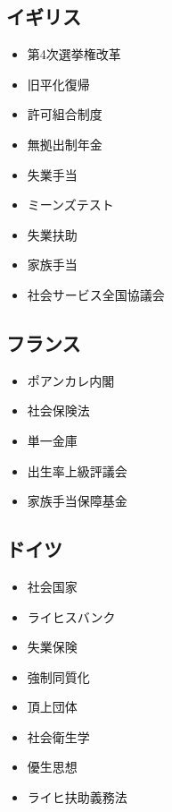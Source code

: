 \documentclass{jsarticle}
\begin{document}
\subsection{イギリス}
\begin{itemize}
	\item 第4次選挙権改革
	\item 旧平化復帰
	\item 許可組合制度
	\item 無拠出制年金
	\item 失業手当
	\item ミーンズテスト
	\item 失業扶助
	\item 家族手当
	\item 社会サービス全国協議会
\end{itemize}


\subsection{フランス}
\begin{itemize}
	\item ポアンカレ内閣
	\item 社会保険法
	\item 単一金庫
	\item 出生率上級評議会
	\item 家族手当保障基金
\end{itemize}

\subsection{ドイツ}
\begin{itemize}
	\item 社会国家
	\item ライヒスバンク
	\item 失業保険
	\item 強制同質化
	\item 頂上団体
	\item 社会衛生学
	\item 優生思想
	\item ライヒ扶助義務法
\end{itemize}
\end{document}
